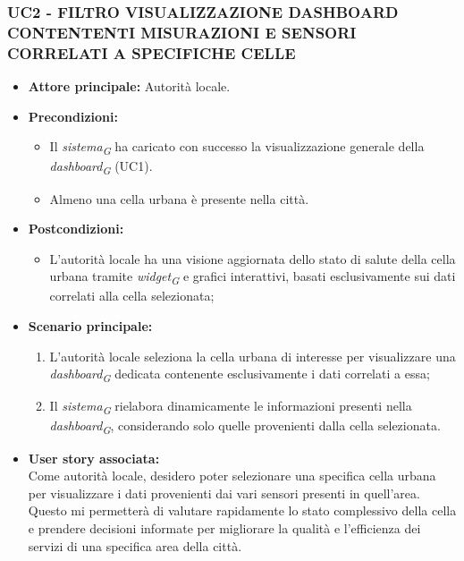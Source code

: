 \subsubsection{UC2 - FILTRO VISUALIZZAZIONE DASHBOARD CONTENTENTI MISURAZIONI E SENSORI CORRELATI A SPECIFICHE CELLE}
\begin{itemize}
    \item \textbf{Attore principale:} Autorità locale.
    \item \textbf{Precondizioni:}
        \begin{itemize}
            \item Il \textit{sistema}\textsubscript{\textit{G}} ha caricato con successo la visualizzazione generale della \textit{dashboard}\textsubscript{\textit{G}} (UC1). 
            \item Almeno una cella urbana è presente nella città. 
        \end{itemize}
    \item \textbf{Postcondizioni:}
        \begin{itemize}
            \item L’autorità locale ha una visione aggiornata dello stato di salute della cella urbana tramite \textit{widget}\textsubscript{\textit{G}} e grafici interattivi, basati esclusivamente sui dati correlati alla cella selezionata; 
        \end{itemize}
    \item \textbf{Scenario principale:}
        \begin{enumerate}
            \item L’autorità locale seleziona la cella urbana di interesse per visualizzare una \textit{dashboard}\textsubscript{\textit{G}} dedicata contenente esclusivamente i dati correlati a essa;
            \item Il \textit{sistema}\textsubscript{\textit{G}} rielabora dinamicamente le informazioni presenti nella \textit{dashboard}\textsubscript{\textit{G}}, considerando solo quelle provenienti dalla cella selezionata.
        \end{enumerate}
    \item \textbf{User story associata:} \\ 
        Come autorità locale, desidero poter selezionare una specifica cella urbana per visualizzare i dati provenienti dai vari sensori presenti in quell’area. Questo mi permetterà di valutare rapidamente lo stato complessivo della cella e prendere decisioni informate per migliorare la qualità e l'efficienza dei servizi di una specifica area della città.
\end{itemize}


